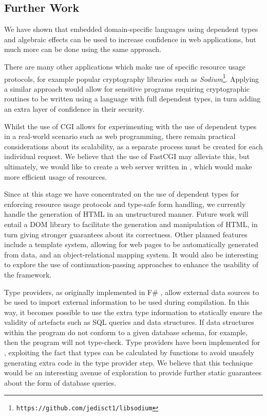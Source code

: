 \subsection{Further Work}

We have shown that embedded domain-specific languages using dependent types and
algebraic effects can be used to increase confidence in web applications, but much more
can be done using the same approach.

There are many other applications which make use of specific resource usage
protocols, for example popular cryptography libraries such as
\textit{Sodium}\footnote{\texttt{https://github.com/jedisct1/libsodium}}.
Applying a similar approach would allow for sensitive programs requiring
cryptographic routines to be written using a language with full dependent
types, in turn adding an extra layer of confidence in their security. 

Whilst the use of CGI allows for experimenting with the use of dependent types
in a real-world scenario such as web programming, there remain practical
considerations about its scalability, as a separate process must be created for
each individual request. We believe that the use of FastCGI may alleviate this,
but ultimately, we would like to create a web server written in \idris{}, which
would make more efficient usage of resources. 

Since at this stage we have concentrated on the use of dependent types for
enforcing resource usage protocols and type-safe form handling, we currently
handle the generation of HTML in an unstructured manner. Future work will
entail a DOM library to facilitate the generation and manipulation of HTML, in
turn giving stronger guarantees about its correctness. Other planned features
include a template system, allowing for web pages to be automatically generated
from data, and an object-relational mapping system. 
It would also be interesting to 
explore the use of continuation-passing approaches \cite{queinnec:ioc} to enhance the usability of the framework.

Type providers, as originally implemented in F\# \cite{msr:tp}, allow external data sources to be used to import
external information to be used during compilation. 
In this way, it becomes possible to use the extra type
information to statically ensure the validity of artefacts such as SQL
queries and data structures. If data structures within the program do not
conform to a given database schema, for example, then the program will not
type-check.  Type providers have been implemented for 
\idris{} 
\cite{christiansen:dtp}, exploiting the fact that types can be
calculated by functions to avoid unsafely generating extra code in the type provider
step. We believe that this technique would be an interesting avenue of exploration to provide further static guarantees about the form of database queries.

